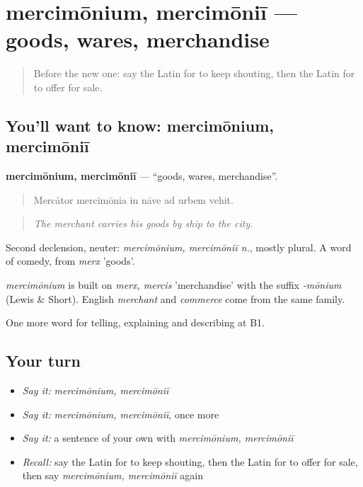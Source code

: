 \section[mercimōnium, mercimōniī]{mercimōnium, mercimōniī — goods, wares, merchandise}

\label{lesson:LA-C462-mercimonium}



\begin{quote}
Before the new one: say the Latin for to keep shouting, then the Latin for to offer for sale.
\end{quote}

\subsection*{You'll want to know: mercimōnium, mercimōniī}
\textbf{mercimōnium, mercimōniī} — \textquotedblleft{}goods, wares, merchandise\textquotedblright{}.

\begin{quote}
Mercātor mercimōnia in nāve ad urbem vehit.
\end{quote}

\begin{quote}
\emph{The merchant carries his goods by ship to the city.}
\end{quote}

Second declension, neuter: \emph{mercimōnium, mercimōniī n.}, mostly plural. A word of comedy, from \emph{merx} 'goods'.

\begin{cousinweb}
\emph{mercimōnium} is built on \emph{merx, mercis} 'merchandise' with the suffix \emph{-mōnium} (Lewis \& Short). English \emph{merchant} and \emph{commerce} come from the same family.
\end{cousinweb}

\begin{grammarlens}[title={What you've built}]
One more word for telling, explaining and describing at B1.
\end{grammarlens}

\subsection*{Your turn}
\begin{itemize}
\raggedright
  \item \emph{Say it:} \emph{mercimōnium, mercimōniī}
  \item \emph{Say it:} \emph{mercimōnium, mercimōniī}, once more
  \item \emph{Say it:} a sentence of your own with \emph{mercimōnium, mercimōniī}
  \item \emph{Recall:} say the Latin for to keep shouting, then the Latin for to offer for sale, then say \emph{mercimōnium, mercimōniī} again
\end{itemize}

